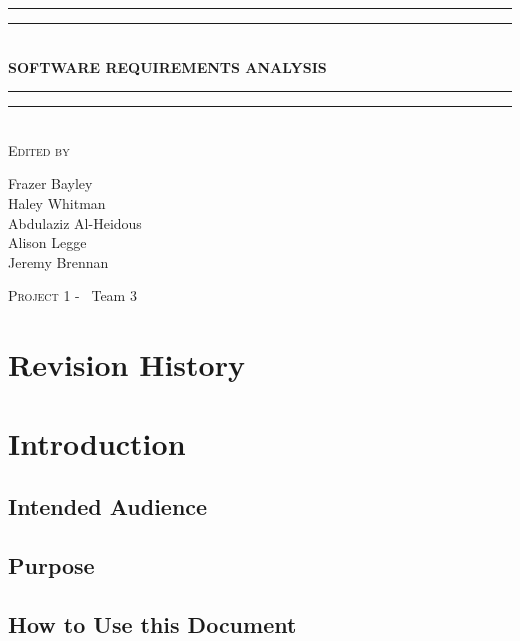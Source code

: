 \documentclass[a4paper, 11pt]{article}
\newlength{\drop}
\begin{document}
	
	\begin{titlepage}
		\textheight
		\centering
		\vspace*{\baselineskip}
		\rule{\textwidth}{1.6pt}\vspace*{-\baselineskip}\vspace*{2pt}
		\rule{\textwidth}{0.4pt}\\[\baselineskip]
		{\LARGE \textbf{SOFTWARE REQUIREMENTS ANALYSIS}}\\[0.2\baselineskip]
		\rule{\textwidth}{0.4pt}\vspace*{-\baselineskip}\vspace{3.2pt}
		\rule{\textwidth}{1.6pt}\\[\baselineskip]
		\scshape
		\vspace*{2\baselineskip}
		Edited by \\[\baselineskip]
		{\Large Frazer Bayley \\ Haley Whitman \\ Abdulaziz Al-Heidous \\ Alison Legge \\ Jeremy Brennan\par}

		\vfill
		{\scshape \LARGE Project 1 -} \        {\LARGE Team 3}\par
	\end{titlepage}


\tableofcontents
\pagebreak


\section{Revision History}
\begin{versionhistory}

\end{versionhistory}


\section{Introduction}

\subsection{Intended Audience}
\subsection{Purpose}
\subsection{How to Use this Document}
\end{document}
